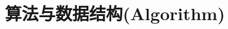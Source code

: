 \documentclass[../../interview-questions.tex]{subfiles}
\begin{document}
\section{算法与数据结构(Algorithm)}








\end{document}

